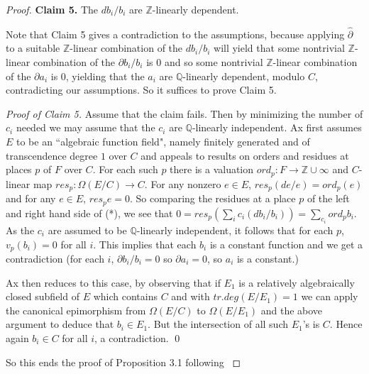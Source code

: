 \documentclass[12pt]{article}
\newcommand{\Q}{\mathbb Q}  \newcommand{\Qq}{\mathbb Q}
\newcommand{\Z}{\mathbb Z}  \newcommand{\Zz}{\mathbb Z}
\begin{document}
\begin{proof}
\vspace{5mm}
\noindent
{\bf Claim 5.}  The $db_{i}/b_{i}$ are ${\mathbb Z}$-linearly dependent. 

\vspace{2mm}
\noindent
Note that Claim 5 gives a contradiction to the assumptions, because applying $\hat\partial$ to a suitable ${\mathbb Z}$-linear combination of the $db_{i}/b_{i}$ will yield that some nontrivial $\mathbb Z$-linear combination of  the $\partial b_{i}/b_{i}$ is $0$ and so some nontrivial ${\mathbb Z}$-linear combination of the $\partial a_{i}$ is $0$, yielding that the $a_{i}$ are $\Q$-linearly dependent, modulo $C$, contradicting our assumptions. 
So it suffices to prove Claim 5.

\vspace{2mm}
\noindent
{\em Proof of Claim 5.}   Assume that the claim fails. Then by minimizing the number of $c_{i}$ needed we may assume that the $c_{i}$ are $\Q$-linearly independent. 
Ax first assumes $E$ to be an ``algebraic function field", namely finitely generated and of transcendence degree $1$ over $C$ and appeals to results on orders and residues at places $p$ of $F$ over $C$. 
For each such $p$ there is a valuation $ord_{p}: F \to \Z \cup\infty$ and $C$-linear map $res_{p}: \Omega(E/C) \to C$.  For any nonzero  $e\in E$,  $res_{p}(de/e) = ord_{p} (e)$ and for any $e\in E$, $res_{p}e = 0$.
So  comparing the residues at a place $p$ of the left and right hand side of (*), we see that $0 = res_{p}(\sum_{i}c_{i}(db_{i}/b_{i})) = \sum_{c_{i}}ord_{p}b_{i}$.  As the $c_{i}$ are assumed to be $\Q$-linearly independent, it follows that for 
each $p$, $v_{p}(b_{i}) = 0$ for all $i$.  This implies that each $b_{i}$ is a constant function and we get a contradiction (for each $i$, $\partial b_{i}/b_{i} = 0$ so $\partial a_{i} = 0$, so $a_{i}$ is a constant.)

Ax then reduces to this case, by observing  that if $E_{1}$ is a relatively algebraically closed subfield of $E$ which contains $C$ and with $tr.deg(E/E_{1}) = 1$ we can apply the canonical epimorphism from $\Omega(E/C)$ to $\Omega(E/E_{1})$ and the above argument to deduce that $b_{i}\in E_{1}$. But the intersection of all such $E_{1}$'s is $C$. Hence again $b_{i}\in C$ for all $i$, a contradiction. \qed

So this ends the proof of Proposition 3.1 following \cite{Ax}
 
\end{proof}
\end{document}
